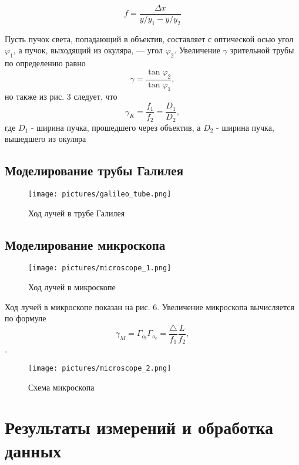 \documentclass[a4paper,12pt]{article}
\begin{document}
\begin{equation}
    f = \frac{\Delta x}{y / y_1 - y / y_2}    
\end{equation}

Пусть пучок света, попадающий в объектив, составляет с оптической осью угол $\varphi_1$, а пучок, выходящий из окуляра, — угол $\varphi_2$. Увеличение $\gamma$ зрительной трубы по определению равно
\begin{equation}
    \gamma = \frac{\tan \varphi_2}{\tan \varphi_1},
\end{equation}
но также из рис. 3 следует, что 
\begin{equation}
    \gamma_K = \frac{f_1}{f_2} = \frac{D_1}{D_2},
\end{equation}
где $D_1$ - ширина пучка, прошедшего через объектив, а $D_2$ - ширина пучка, вышедшего из окуляра

\subsection{Моделирование трубы Галилея}

\FloatBarrier
\begin{figure}[!ht]
    \centering
    \texttt{[image: pictures/galileo\_tube.png]}
    \caption{Ход лучей в трубе Галилея}
    \label{fig:vac}
\end{figure}
\FloatBarrier

\subsection{Моделирование микроскопа}

\begin{figure}[h]
    \centering
    \texttt{[image: pictures/microscope\_1.png]}
    \caption{Ход лучей в микроскопе}
    \label{fig:vac}
\end{figure}


Ход лучей в микроскопе показан на рис. 6. Увеличение микроскопа вычисляется по формуле
    \begin{equation}
        \gamma_M = \Gamma_{o_b} \Gamma_{o_c} = \frac{\triangle}{f_1} \frac{L}{f_2},
    \end{equation}.
    
    \begin{figure}[h]
    \centering
    \texttt{[image: pictures/microscope\_2.png]}
    \caption{Схема микроскопа}
    \label{fig:vac}
\end{figure}   

\section{Результаты измерений и обработка данных}
\end{document}
